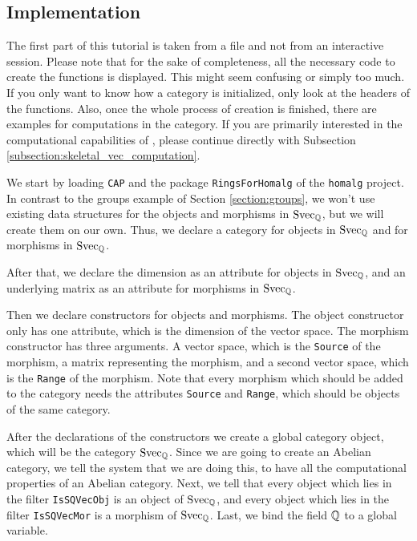 \subsection{Implementation}

The first part of this tutorial is taken from a file and not from
an interactive session. Please note that for the sake of completeness, all the necessary code to create the
functions is displayed. This might seem confusing or simply too much. If you only want to know how a \CapPkg category
is initialized, only look at the headers of the functions. Also, once the whole process of creation is finished,
there are examples for computations in the category. If you are primarily interested in the computational capabilities of \CapPkg, please
continue directly with Subsection \ref{subsection:skeletal_vec_computation}.



We start by loading \texttt{CAP} and the package \texttt{RingsForHomalg} of the \texttt{homalg} project.
In contrast to the groups example of Section \ref{section:groups}, we won't use existing data structures for the objects and morphisms
in $\mathrm{Svec}_{\mathbb{Q}}$, but we will create them on our own. Thus, we declare
a \GAP category for objects in $\mathrm{Svec}_{\mathbb{Q}}$ and for morphisms in $\mathrm{Svec}_{\mathbb{Q}}$.

After that, we declare the dimension as an attribute for objects in $\mathrm{Svec}_{\mathbb{Q}}$,
and an underlying matrix as an attribute for morphisms in $\mathrm{Svec}_{\mathbb{Q}}$.

Then we declare constructors
for objects and morphisms. The object constructor only has one attribute, which is the dimension of the vector space.
The morphism constructor has three arguments. A vector space, which is the \texttt{Source} of the morphism, a matrix
representing the morphism, and a second vector space, which is the \texttt{Range} of the morphism. Note that every morphism
which should be added to the category needs the \GAP attributes \texttt{Source} and \texttt{Range}, which should be
objects of the same category.

After the declarations of the constructors we create a global category \GAP object, which will be the category $\mathrm{Svec}_{\mathbb{Q}}$.
Since we are going to create an Abelian category, we tell the system that we are doing this, to have all the computational
properties of an Abelian category. 
Next, we tell \CapPkg that every \GAP object which lies in the filter \texttt{IsSQVecObj} is an object of $\mathrm{Svec}_{\mathbb{Q}}$,
and every \GAP object which lies in the filter \texttt{IsSQVecMor} is a morphism of $\mathrm{Svec}_{\mathbb{Q}}$.
Last, we bind the field $\mathbb{Q}$ to a global variable.

